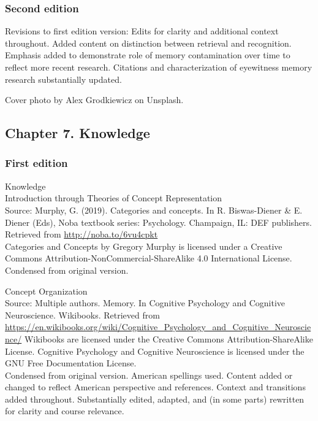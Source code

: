 \documentclass[
]{krantz}
\begin{document}
\subsubsection*{Second edition}\label{second-edition-6}


Revisions to first edition version: Edits for clarity and additional context throughout. Added content on distinction between retrieval and recognition. Emphasis added to demonstrate role of memory contamination over time to reflect more recent research. Citations and characterization of eyewitness memory research substantially updated.

Cover photo by Alex Grodkiewicz on Unsplash.

\subsection*{Chapter 7. Knowledge}\label{chapter-7.-knowledge}


\subsubsection*{First edition}\label{first-edition-7}


Knowledge\\
Introduction through Theories of Concept Representation\\
Source: Murphy, G. (2019). Categories and concepts. In R. Biswas-Diener \& E. Diener (Eds), Noba textbook series: Psychology. Champaign, IL: DEF publishers. Retrieved from \url{http://noba.to/6vu4cpkt}\\
Categories and Concepts by Gregory Murphy is licensed under a Creative Commons Attribution-NonCommercial-ShareAlike 4.0 International License.\\
Condensed from original version.

Concept Organization\\
Source: Multiple authors. Memory. In Cognitive Psychology and Cognitive Neuroscience. Wikibooks. Retrieved from \url{https://en.wikibooks.org/wiki/Cognitive_Psychology_and_Cognitive_Neuroscience/}
Wikibooks are licensed under the Creative Commons Attribution-ShareAlike License.
Cognitive Psychology and Cognitive Neuroscience is licensed under the GNU Free Documentation License.\\
Condensed from original version. American spellings used. Content added or changed to reflect American perspective and references. Context and transitions added throughout. Substantially edited, adapted, and (in some parts) rewritten for clarity and course relevance.
\end{document}
